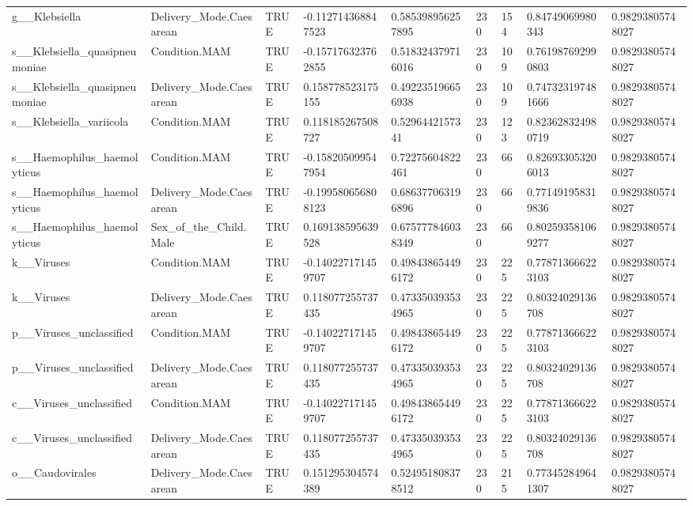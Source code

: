\begin{longtable}{lllllllll}
g\_\_Klebsiella & Delivery\_Mode.Caesarean & TRUE & -0.112714368847523 & 0.585398956257895 & 230 & 154 & 0.84749069980343 & 0.98293805748027 \\
s\_\_Klebsiella\_quasipneumoniae & Condition.MAM & TRUE & -0.157176323762855 & 0.518324379716016 & 230 & 109 & 0.761987692990803 & 0.98293805748027 \\
s\_\_Klebsiella\_quasipneumoniae & Delivery\_Mode.Caesarean & TRUE & 0.158778523175155 & 0.492235196656938 & 230 & 109 & 0.747323197481666 & 0.98293805748027 \\
s\_\_Klebsiella\_variicola & Condition.MAM & TRUE & 0.118185267508727 & 0.5296442157341 & 230 & 123 & 0.823628324980719 & 0.98293805748027 \\
s\_\_Haemophilus\_haemolyticus & Condition.MAM & TRUE & -0.158205099547954 & 0.72275604822461 & 230 & 66 & 0.826933053206013 & 0.98293805748027 \\
s\_\_Haemophilus\_haemolyticus & Delivery\_Mode.Caesarean & TRUE & -0.199580656808123 & 0.686377063196896 & 230 & 66 & 0.771491958319836 & 0.98293805748027 \\
s\_\_Haemophilus\_haemolyticus & Sex\_of\_the\_Child.Male & TRUE & 0.169138595639528 & 0.675777846038349 & 230 & 66 & 0.802593581069277 & 0.98293805748027 \\
k\_\_Viruses & Condition.MAM & TRUE & -0.140227171459707 & 0.498438654496172 & 230 & 225 & 0.778713666223103 & 0.98293805748027 \\
k\_\_Viruses & Delivery\_Mode.Caesarean & TRUE & 0.118077255737435 & 0.473350393534965 & 230 & 225 & 0.80324029136708 & 0.98293805748027 \\
p\_\_Viruses\_unclassified & Condition.MAM & TRUE & -0.140227171459707 & 0.498438654496172 & 230 & 225 & 0.778713666223103 & 0.98293805748027 \\
p\_\_Viruses\_unclassified & Delivery\_Mode.Caesarean & TRUE & 0.118077255737435 & 0.473350393534965 & 230 & 225 & 0.80324029136708 & 0.98293805748027 \\
c\_\_Viruses\_unclassified & Condition.MAM & TRUE & -0.140227171459707 & 0.498438654496172 & 230 & 225 & 0.778713666223103 & 0.98293805748027 \\
c\_\_Viruses\_unclassified & Delivery\_Mode.Caesarean & TRUE & 0.118077255737435 & 0.473350393534965 & 230 & 225 & 0.80324029136708 & 0.98293805748027 \\
o\_\_Caudovirales & Delivery\_Mode.Caesarean & TRUE & 0.151295304574389 & 0.524951808378512 & 230 & 215 & 0.773452849641307 & 0.98293805748027 \\

\end{longtable}
